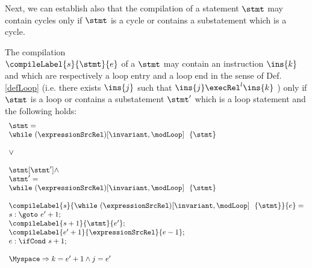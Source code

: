 Next, we can establish also that the compilation of a statement $\stmt$ may  contain  cycles only if $\stmt$ is a cycle or contains
a substatement which is a cycle. 
\begin{compProp4}\label{compile:prop:compProp4}  %
The compilation \\ $\compileLabel{s}{\stmt}{e}$ of a $\stmt$ may contain an instruction $\ins{k}$ and   which are respectively 
a loop entry and a loop end  in the sense of Def.
\ref{defLoop} (i.e. there exists $\ins{j}$ such that $\ins{j} \execRel^{l} \ins{k}$ ) only if  $\stmt$ is a loop or contains 
 a substatement $\stmt'$ which is a loop statement and the following holds:
  $$\begin{array}{l}
                        \stmt = \\             
	                \while \ (\expressionSrcRel) \lbrack \invariant, \modLoop \rbrack \ \do \ \{ \stmt \} \\ \\ 
			\vee \\\\

                        \stmt[\stmt'] \wedge \\
			\stmt' = \\
             
	                \while \ (\expressionSrcRel) \lbrack \invariant, \modLoop \rbrack \ \do \ \{ \stmt \} \\ \\ 

                        \compileLabel{s}{   \while \ (\expressionSrcRel) \lbrack \invariant, \modLoop \rbrack \ \do \ \{ \stmt \}   }{e} = \\
			s: \goto \ e' + 1; \\
	                \compileLabel{s +  1}{\stmt}{e'}; \\
			 \compileLabel{e' +  1}{\expressionSrcRel}{e  -1 };\\
			 e: \ifCond \ s +  1; \\  \\
                        \Myspace \Rightarrow k = e' +1 \wedge j = e'  
                
	           \end{array} 
               $$ 
	   
              
             

\end{compProp4}
 
